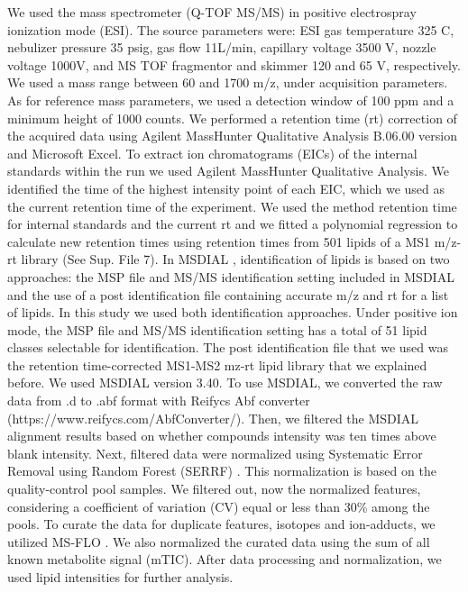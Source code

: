 \documentclass[9pt,twocolumn,twoside,lineno]{BioRxiv}
\begin{document}
We used the mass spectrometer (Q-TOF MS/MS) in positive electrospray ionization mode (ESI).
The source parameters were: ESI gas temperature 325 \degree C, nebulizer pressure 35 psig, gas flow 11L/min, capillary voltage 3500 V, nozzle voltage 1000V, and MS TOF fragmentor and skimmer 120 and 65 V, respectively.
We used a mass range between 60 and 1700 m/z, under acquisition parameters. 
As for reference mass parameters, we used a detection window of 100 ppm and a minimum height of 1000 counts. 
We performed a retention time (rt) correction of the acquired data using Agilent MassHunter Qualitative Analysis B.06.00 version and Microsoft Excel. 
To extract ion chromatograms (EICs) of the internal standards within the run we used Agilent MassHunter Qualitative Analysis.
We identified the time of the highest intensity point of each EIC, which we used as the current retention time of the experiment. 
We used the method retention time for internal standards and the current rt and we fitted a polynomial regression to calculate new retention times using retention times from 501 lipids of a MS1 m/z-rt library (See Sup. File 7). 
In MSDIAL \cite{Tsugawa2015-kh}, identification of lipids is based on two approaches: the MSP file and MS/MS identification setting included in MSDIAL and the use of a post identification file containing accurate m/z and rt for a list of lipids. 
In this study we used both identification approaches. 
Under positive ion mode, the MSP file and MS/MS identification setting has a total of 51 lipid classes  selectable for identification. 
The post identification file that we used was the retention time-corrected MS1-MS2 mz-rt lipid library that we explained before. 
We used MSDIAL \cite{Tsugawa2015-kh} version 3.40. 
To use MSDIAL, we converted the raw data from .d to .abf format with Reifycs Abf converter (https://www.reifycs.com/AbfConverter/). 
Then, we filtered the MSDIAL alignment results based on whether compounds intensity was ten times above blank intensity. Next, filtered data were normalized using Systematic Error Removal using Random Forest (SERRF) \cite{Fan2019}. This normalization is based on the quality-control pool samples. 
We filtered out, now the normalized features, considering a coefficient of variation (CV) equal or less than 30\% among the pools. 
To curate the data for duplicate features, isotopes and ion-adducts, we utilized MS-FLO \cite{DeFelice2017-ms}.
We also normalized the curated data using the sum of all known metabolite signal (mTIC). 
After data processing and normalization, we used lipid intensities for further analysis.
\end{document}
